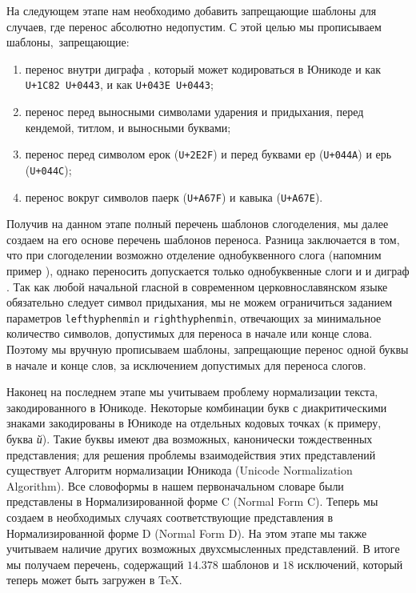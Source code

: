 \documentclass[12pt,a4paper,oneside]{extarticle}
\begin{document}
На следующем этапе нам необходимо добавить запрещающие шаблоны для случаев, где перенос абсолютно недопустим. С этой целью мы прописываем шаблоны, запрещающие:

\begin{enumerate}
\item перенос внутри диграфа , который может кодироваться в Юникоде и как \verb!U+1C82 U+0443!, и как \verb!U+043E U+0443!;
\item перенос перед выносными символами ударения и придыхания, перед кендемой, титлом, и выносными буквами\autocite[Полный перечень символов вместе с их кодовыми точками в Юникоде, а также полный перечень возможных слов с титлом или буквенными титлами см. ][]{utn41};
\item перенос перед символом ерок (\verb!U+2E2F!) и перед буквами ер (\verb!U+044A!) и ерь (\verb!U+044C!);
\item перенос вокруг символов паерк (\verb!U+A67F!) и кавыка (\verb!U+A67E!).
\end{enumerate}

Получив на данном этапе полный перечень шаблонов слогоделения, мы далее создаем на его основе перечень шаблонов переноса. Разница заключается в том, что при слогоделении возможно отделение однобуквенного слога (напомним пример ), однако переносить допускается только однобуквенные слоги  и  и диграф . Так как любой начальной гласной в современном церковнославянском языке обязательно следует символ придыхания, мы не можем ограничиться заданием параметров \verb+lefthyphenmin+ и \verb+righthyphenmin+, отвечающих за минимальное количество символов, допустимых для переноса в начале или конце слова. Поэтому мы вручную прописываем шаблоны, запрещающие перенос одной буквы в начале и конце слов, за исключением допустимых для переноса слогов.

Наконец на последнем этапе мы учитываем проблему нормализации текста, закодированного в Юникоде. Некоторые комбинации букв с диакритическими знаками закодированы в Юникоде на отдельных кодовых точках (к примеру, буква \emph{й}). Такие буквы имеют два возможных, канонически тождественных представления; для решения проблемы взаимодействия этих представлений существует Алгоритм нормализации Юникода (\textenglish{Unicode Normalization Algorithm})\autocite[Подробности см. ][]{tr15}. Все словоформы в нашем первоначальном словаре были представлены в Нормализированной форме C (\textenglish{Normal Form C}). Теперь мы создаем в необходимых случаях соответствующие представления в Нормализированной форме D (\textenglish{Normal Form D}). На этом этапе мы также учитываем наличие других возможных двухсмысленных представлений\autocite[Специфику нормализации церковнославянского текста см. в работе ][]{utn41}. В итоге мы получаем перечень, содержащий $14.378$ шаблонов и $18$ исключений, который теперь может быть загружен в \TeX{}.
\end{document}
